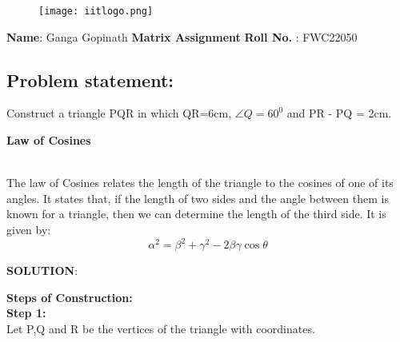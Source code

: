\documentclass[10pt,a4paper]{article}
\begin{document}
\begin{figure*}[!tbp]
 \centering
  \begin{minipage}[b]{0.4\textwidth}
  \texttt{[image: iitlogo.png]} 
  \end{minipage}
\end{figure*}
\raggedright \textbf{Name}:\hspace{1mm} Ganga Gopinath\hspace{3cm} \Large \textbf{Matrix Assignment}\hspace{2.5cm} %
\normalsize \textbf{Roll No.} :\hspace{1mm} FWC22050\vspace{1cm}
\begin{multicols}{2}
\section{Problem statement:}  Construct a triangle PQR in which QR=6cm, $\angle{Q}=60^0$ and PR - PQ = 2cm.\vspace{3mm}


\textbf{Law of Cosines}
\vspace{2mm}\raggedright \\

The law of Cosines relates the length of the triangle to the cosines of one of its angles. It states that, if the length of two sides and the angle between them is known for a triangle, then we can determine the length of the third side. It is given by:
\begin{equation}
\alpha^2=\beta^2+\gamma^2-2\beta\gamma\cos\theta
\end{equation}
\raggedright \textbf{SOLUTION}:\vspace{5mm}\\
\raggedright \textbf{Steps of Construction:}\vspace{2mm}\\
\textbf{Step 1:}\vspace{2mm}\\
Let P,Q and R be the vertices of the triangle  with coordinates.


\end{multicols}
\end{document}
